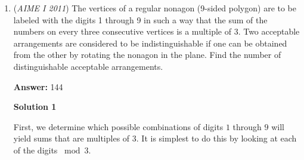 \begin{enumerate}
 How do we simplify $IC$? Well, we can perform the \href{https://artofproblemsolving.com/wiki/index.php?title=Law\_of\_Sines}{Law of Sines} on triangle $AIC$. This results in:

 $\frac{AC}{\sin(\angle AIC)}=\frac{IC}{\sin\left(\frac{\alpha}{2}\right)}$

 The value of $\angle AIC$ is $\frac{\alpha+2\beta+\gamma}{2}$ by the Exterior Angle Theorem on $\triangle ABI$, so the value of $\sin(\angle AIC)$ is equivalent to the value of $\cos\left(\frac{\beta}{2}\right)$ by a similar argument as above. Then rearranging yields $IC = b\cdot\frac{\sin\left(\frac{\alpha}{2}\right)}{\cos\left(\frac{\beta}{2}\right)}$.

 Going back to the previous formula $MN = IC\cdot\sin\left(\frac{\alpha+\beta+2\gamma}{2}\right)$ and substituting values yields:

 $MN = b\cdot\frac{\sin\left(\frac{\alpha}{2}\right)\cos\left(\frac{\gamma}{2}\right)}{\cos\left(\frac{\beta}{2}\right)}$.

 Finally, using the formulae $\sin\left(\frac{\alpha}{2}\right)=\sqrt{\frac{(s-b)(s-c)}{bc}}$ and $\cos\left(\frac{\alpha}{2}\right)=\sqrt{\frac{s(s-a)}{bc}}$ (where $s$ is half the perimeter of the triangle), we reach our final value:

 $MN = b\cdot\frac{\sqrt{\frac{(s-b)(s-c)}{bc}}\cdot\sqrt{\frac{s(s-c)}{ab}}}{\sqrt{\frac{s(s-b)}{ac}}}$
$=\frac{\sqrt{s(s-b)(s-c)^2}}{\sqrt{s(s-b)}}$
$=\sqrt{(s-c)^2}$
$=s-c$
$=181-125$
$=\boxed{056}.$



	\item (\textit{AIME I 2011}) The vertices of a regular nonagon (9-sided polygon) are to be labeled with the digits 1 through 9 in such a way that the sum of the numbers on every three consecutive vertices is a multiple of 3.  Two acceptable arrangements are considered to be indistinguishable if one can be obtained from the other by rotating the nonagon in the plane.  Find the number of distinguishable acceptable arrangements.


 
 \textbf{Answer: }144



\textbf{Solution 1}

First, we determine which possible combinations of digits $1$ through $9$ will yield sums that are multiples of $3$. It is simplest to do this by looking at each of the digits $\bmod{3}$.


\end{enumerate}
